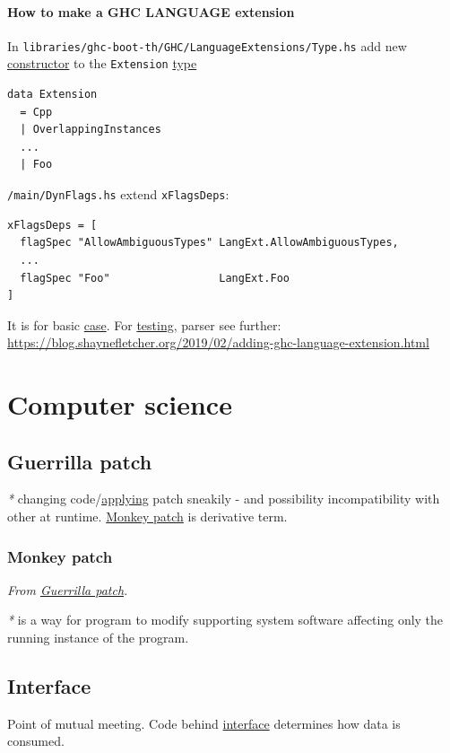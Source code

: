 \documentclass[a4paper,14pt,oneside]{book}
\begin{document}
\subsubsection{How to make a GHC LANGUAGE extension}
\label{sec:orgf1bca71}

In \texttt{libraries/ghc-boot-th/GHC/LanguageExtensions/Type.hs} add new \hyperref[org86417e7]{constructor} to the \texttt{Extension} \hyperref[org4e3af4c]{type}
\begin{verbatim}
data Extension
  = Cpp
  | OverlappingInstances
  ...
  | Foo
\end{verbatim}

\texttt{/main/DynFlags.hs} extend \texttt{xFlagsDeps}:
\begin{verbatim}
xFlagsDeps = [
  flagSpec "AllowAmbiguousTypes" LangExt.AllowAmbiguousTypes,
  ...
  flagSpec "Foo"                 LangExt.Foo
]
\end{verbatim}
It is for basic \hyperref[orgc4d5be2]{case}. For \hyperref[org405aa18]{testing}, parser see further: \url{https://blog.shaynefletcher.org/2019/02/adding-ghc-language-extension.html}

\chapter{Computer science}
\label{sec:org4f701ec}
\section{\label{org5c3b797}Guerrilla patch}
\label{sec:orgf4cc107}
\emph{*} changing code/\hyperref[org759d03b]{applying} patch sneakily - and possibility incompatibility with other at runtime.
\hyperref[orge34a48f]{Monkey patch} is derivative term.

\subsection{\label{orge34a48f}Monkey patch}
\label{sec:orgf31eab1}
\emph{From \hyperref[org5c3b797]{Guerrilla patch}.}

\emph{*} is a way for program to modify supporting system software affecting only the running instance of the program.

\section{\label{org5e8a020}Interface}
\label{sec:org97f52a0}
Point of mutual meeting. Code behind \hyperref[org5e8a020]{interface} determines how data is consumed.
\end{document}
